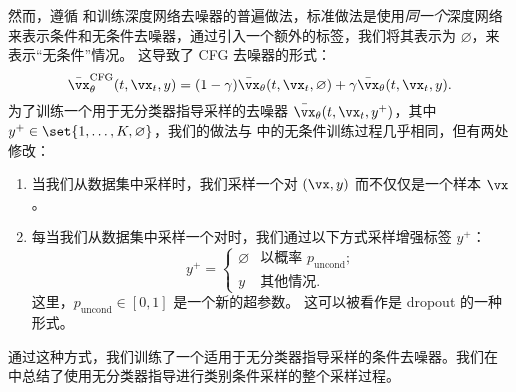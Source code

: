 \documentclass[../../book-main.tex]{subfiles}
\begin{document}

然而，遵循 \textcite{Ho2022-ry} 和训练深度网络去噪器的普遍做法，标准做法是使用\textit{同一个}深度网络来表示条件和无条件去噪器，通过引入一个额外的标签，我们将其表示为 $\varnothing$，来表示“无条件”情况。
这导致了 CFG 去噪器的形式：
\begin{equation}\label{eq:conditional-denoising-mmse-denoiser-paired-data-approx-cfg}
  \bar{\vx}_{\theta}^{\mathrm{CFG}}(t, \vx_t, y)
  =
  (1 - \gamma) \bar{\vx}_{\theta}(t, \vx_t, \varnothing)
  +
  \gamma \bar{\vx}_{\theta}(t, \vx_t, y).
\end{equation}
为了训练一个用于无分类器指导采样的去噪器 $\bar{\vx}_{\theta}(t, \vx_t, y^+)$，其中 $y^+ \in \set{1, \dots, K, \varnothing}$，我们的做法与  中的无条件训练过程几乎相同，但有两处修改：
\begin{enumerate}
  \item 当我们从数据集中采样时，我们采样一个对 $(\vx, y)$ 而不仅仅是一个样本 $\vx$。
  \item 每当我们从数据集中采样一个对时，我们通过以下方式采样增强标签 $y^+$：
    \begin{equation}
      y^+ = \begin{cases}
        \varnothing & \text{以概率 } p_{\mathrm{uncond}}; \\
        y & \text{其他情况}.
      \end{cases}
    \end{equation}
    这里，$p_{\mathrm{uncond}} \in [0, 1]$ 是一个新的超参数。
    这可以被看作是 dropout \cite{srivastava2014dropout} 的一种形式。
\end{enumerate}
通过这种方式，我们训练了一个适用于无分类器指导采样的条件去噪器。我们在  中总结了使用无分类器指导进行类别条件采样的整个采样过程。
\end{document}
